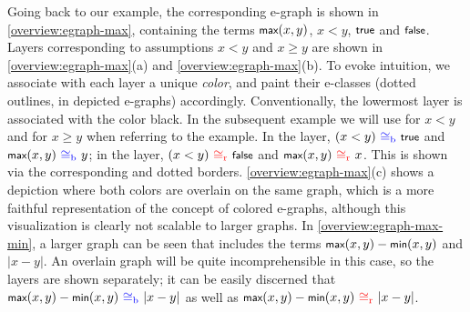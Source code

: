 Going back to our example, the corresponding e-graph is
shown in \autoref{overview:egraph-max},
containing the terms $\tmax(x, y)$, $x < y$, $\ttrue$ and $\tfalse$.
Layers corresponding to assumptions $x < y$ and $x \geq y$ are shown in \ref{overview:egraph-max}(a) and \ref{overview:egraph-max}(b).
To evoke intuition, we associate with each layer a unique \emph{color}, and paint their e-classes (dotted outlines, in depicted e-graphs) accordingly.
Conventionally, the lowermost layer is associated with the color black.
In the subsequent example we will use \cblue for $x<y$ and \cred for $x\geq y$ when referring to the example.
In the \cblue layer, $(x < y) \congblue \ttrue$ and
$\tmax(x, y) \congblue y$;
in the \cred layer, $(x < y) \congred \tfalse$
and $\tmax(x, y) \congred x$.
This is shown via the corresponding 
\cblue and \cred dotted borders.
\autoref{overview:egraph-max}(c) shows a depiction where both colors are overlain on the same graph, which is a more faithful representation of the concept of colored e-graphs,
although this visualization is clearly not scalable to larger graphs.
In \autoref{overview:egraph-max-min}, a larger graph can be seen that includes the terms $\tmax(x,y)-\tmin(x,y)$ and $|x-y|$.
An overlain graph will be quite incomprehensible in this case, so the layers are shown separately; it can be easily discerned that $\tmax(x,y)-\tmin(x,y) \congblue |x-y|$
as well as $\tmax(x,y)-\tmin(x,y) \congred |x-y|$.

